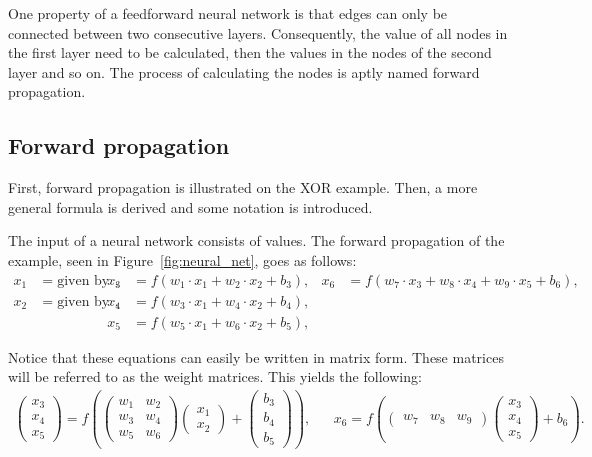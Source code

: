 One property of a feedforward neural network is that edges can only be connected between two consecutive layers.
Consequently, the value of all nodes in the first layer need to be calculated, then the values in the nodes of the second layer and so on.
The process of calculating the nodes is aptly named forward propagation.

\subsection{Forward propagation}\label{s:fp}
First, forward propagation is illustrated on the XOR example.
Then, a more general formula is derived and some notation is introduced.

The input of a neural network consists of values.
The forward propagation of the example, seen in Figure~\ref{fig:neural_net}, goes as follows:
\begin{align*}
    x_1 & = \text{given by input}, & x_3 & = f(w_1\cdot x_1 + w_2\cdot x_2 + b_3), & x_6 & = f(w_7\cdot x_3 + w_8\cdot x_4+ w_9\cdot x_5 + b_6), \\
    x_2 & = \text{given by input}, & x_4 & = f(w_3\cdot x_1 + w_4\cdot x_2 + b_4),                                                               \\
        &                          & x_5 & = f(w_5\cdot x_1 + w_6\cdot x_2 + b_5),
\end{align*}

Notice that these equations can easily be written in matrix form.
These matrices will be referred to as the weight matrices.
This yields the following:
\begin{align*}
    \begin{pmatrix}
        x_3 \\x_4\\x_5
    \end{pmatrix}
    =
    f\left(
    \begin{pmatrix}
        w_1 & w_2 \\
        w_3 & w_4 \\
        w_5 & w_6
    \end{pmatrix}
    \begin{pmatrix}
        x_1 \\x_2
    \end{pmatrix}
    +
    \begin{pmatrix}
        b_3 \\b_4\\b_5
    \end{pmatrix}
    \right), &  &
        x_6
    =
    f\left(
    \begin{pmatrix}
        w_7 & w_8 & w_9
    \end{pmatrix}
    \begin{pmatrix}
        x_3 \\ x_4\\ x_5
    \end{pmatrix}
    +
        b_6
    \right).
\end{align*}

